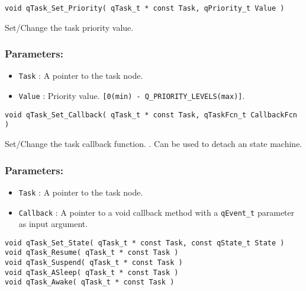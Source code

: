 \noindent\hrulefill


\begin{lstlisting}[style=CStyle]
void qTask_Set_Priority( qTask_t * const Task, qPriority_t Value )
\end{lstlisting}

Set/Change the task priority value. 

\subsubsection*{Parameters:}
\begin{itemize}
    \item \lstinline{Task} : A pointer to the task node.
    \item \lstinline{Value} : Priority value. \lstinline{[0(min) - Q_PRIORITY_LEVELS(max)]}. 
\end{itemize}

\noindent\hrulefill


\begin{lstlisting}[style=CStyle]
void qTask_Set_Callback( qTask_t * const Task, qTaskFcn_t CallbackFcn )
\end{lstlisting}

Set/Change the task callback function. . Can be used to detach an state machine.

\subsubsection*{Parameters:}
\begin{itemize}
    \item \lstinline{Task} : A pointer to the task node.
    \item \lstinline{Callback} : A pointer to a void callback method with a \lstinline{qEvent_t} parameter as input argument.
\end{itemize}

\noindent\hrulefill


\begin{lstlisting}[style=CStyle]
void qTask_Set_State( qTask_t * const Task, const qState_t State ) 
void qTask_Resume( qTask_t * const Task ) 
void qTask_Suspend( qTask_t * const Task )
void qTask_ASleep( qTask_t * const Task )
void qTask_Awake( qTask_t * const Task )
\end{lstlisting}   

